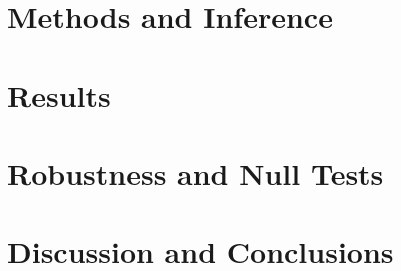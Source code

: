 \documentclass[11pt]{article}
\begin{document}
\section{Methods and Inference}


\section{Results}


\section{Robustness and Null Tests}


\section{Discussion and Conclusions}




\end{document}
